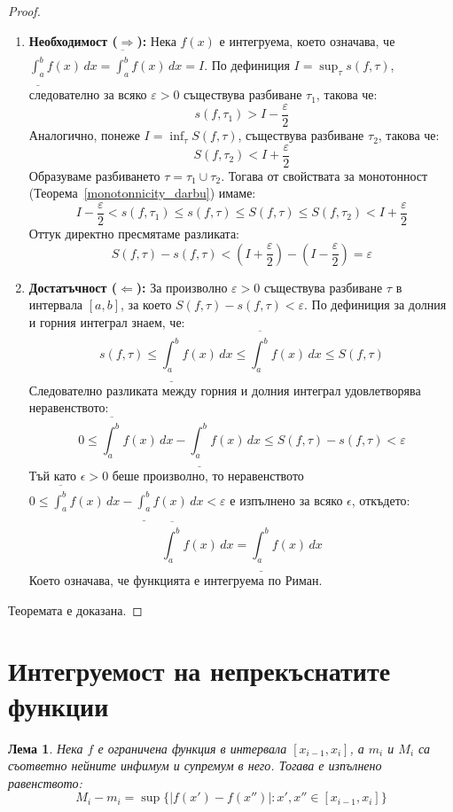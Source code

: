 \documentclass{scrartcl}
\newtheorem{lemma}{Лема}
\begin{document}
\begin{FlushLeft}
\begin{proof}~
\begin{enumerate}
    \item \textbf{Необходимост ($\Rightarrow$):}
    Нека $f(x)$ е интегруема, което означава, че $\underline{\int_{a}^{b}} f(x)\,dx = \overline{\int_{a}^{b}} f(x)\,dx = I$.
    По дефиниция $I = \sup_\tau s(f, \tau)$, следователно за всяко $\varepsilon > 0$ съществува разбиване $\tau_1$, такова че:
    \[ s(f, \tau_1) > I - \frac{\varepsilon}{2} \]
    Аналогично, понеже $I = \inf_\tau S(f, \tau)$, съществува разбиване $\tau_2$, такова че:
    \[ S(f, \tau_2) < I + \frac{\varepsilon}{2} \]
    Образуваме разбиването $\tau = \tau_1 \cup \tau_2$. Тогава от свойствата за монотонност (Теорема~\ref{monotonnicity_darbu}) имаме:
    \[ I - \frac{\varepsilon}{2} < s(f, \tau_1) \le s(f, \tau) \le S(f, \tau) \le S(f, \tau_2) < I + \frac{\varepsilon}{2} \]
    Оттук директно пресмятаме разликата:
    \[ S(f, \tau) - s(f, \tau) < \left(I + \frac{\varepsilon}{2}\right) - \left(I - \frac{\varepsilon}{2}\right) = \varepsilon \]
    
    \item \textbf{Достатъчност ($\Leftarrow$):}
    За произволно $\varepsilon > 0$ съществува разбиване $\tau$ в интервала $[a, b]$, за което $S(f, \tau) - s(f, \tau) < \varepsilon$. По дефиниция за долния и горния интеграл знаем, че:
    \[ s(f, \tau) \le \underline{\int_{a}^{b}} f(x)\,dx \le \overline{\int_{a}^{b}} f(x)\,dx \le S(f, \tau) \]
    Следователно разликата между горния и долния интеграл удовлетворява неравенството:
    \[ 0 \le \overline{\int_{a}^{b}} f(x)\,dx - \underline{\int_{a}^{b}} f(x)\,dx \le S(f, \tau) - s(f, \tau) < \varepsilon \]
    Тъй като $\epsilon > 0$ беше произволно, то неравенството $0 \le \overline{\int_{a}^{b}} f(x)\,dx - \underline{\int_{a}^{b}} f(x)\,dx < \varepsilon$ е изпълнено за всяко $\epsilon$, откъдето:
    \[ \overline{\int_{a}^{b}} f(x)\,dx = \underline{\int_{a}^{b}} f(x)\,dx \]
    Което означава, че функцията е интегруема по Риман.
\end{enumerate}
Теоремата е доказана.
\end{proof}

\section{Интегруемост на непрекъснатите функции}

\begin{lemma}\label{lemma:oscillation}
Нека $f$ е ограничена функция в интервала $[x_{i-1}, x_i]$, а $m_i$ и $M_i$ са съответно нейните инфимум и супремум в него. Тогава е изпълнено равенството:
\[ M_i - m_i = \sup \{ |f(x') - f(x'')| : x', x'' \in [x_{i-1}, x_i] \} \]
\end{lemma}


\end{FlushLeft}
\end{document}

